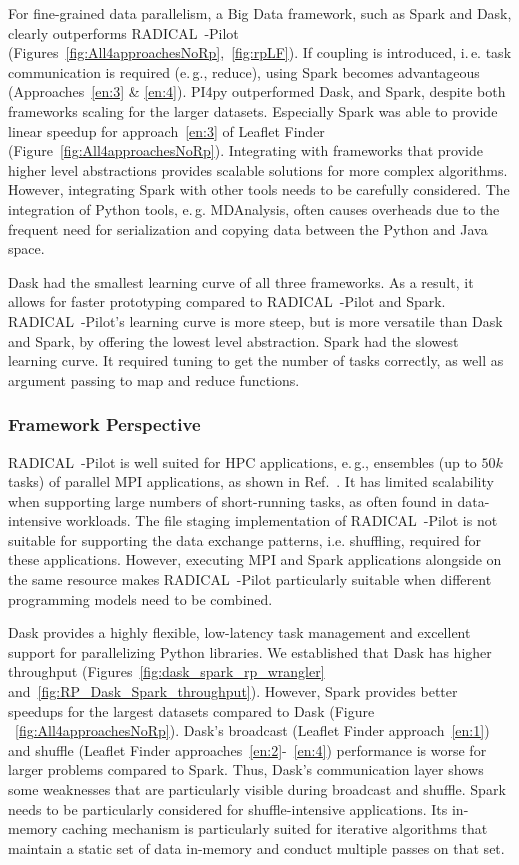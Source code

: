 For fine-grained data parallelism, a Big Data framework, such as Spark and Dask, clearly outperforms RADICAL~-Pilot (Figures~\ref{fig:All4approachesNoRp},~\ref{fig:rpLF}).
If coupling is introduced, i.\,e. task communication is required (e.\,g., reduce), using Spark becomes advantageous (Approaches~\ref{en:3} \& \ref{en:4}). 
PI4py outperformed Dask, and Spark, despite both frameworks scaling for the larger datasets.
Especially Spark was able to provide linear speedup for approach~\ref{en:3} of Leaflet Finder (Figure~\ref{fig:All4approachesNoRp}).
Integrating with frameworks that provide higher level abstractions provides scalable solutions for more complex algorithms.
However, integrating Spark with other tools needs to be carefully considered.
The integration of Python tools, e.\,g. MDAnalysis, often causes overheads due to the frequent need for serialization and copying data between the Python and Java space.

Dask had the smallest learning curve of all three frameworks.
As a result, it allows for faster prototyping compared to RADICAL~-Pilot and Spark.
RADICAL~-Pilot's learning curve is more steep, but is more versatile than Dask and Spark, by offering the lowest level abstraction. 
Spark had the slowest learning curve.
It required tuning to get the number of tasks correctly, as well as argument passing to map and reduce functions.

\subsubsection*{Framework Perspective}
RADICAL~-Pilot is well suited for HPC applications, e.\,g., ensembles (up to $50k$ tasks) of parallel MPI applications, as shown in Ref.~\cite{merzky2018design,merzky2019using}.
It has limited scalability when supporting large numbers of short-running tasks, as often found in data-intensive workloads.
The file staging implementation of RADICAL~-Pilot is not suitable for supporting the data exchange patterns, i.e. shuffling, required for these applications.
However, executing MPI and Spark applications alongside on the same resource makes RADICAL~-Pilot particularly suitable when different programming models need to be combined.

Dask provides a highly flexible, low-latency task management and excellent support for parallelizing Python libraries.
We established that Dask has higher throughput (Figures~\ref{fig:dask_spark_rp_wrangler} and~\ref{fig:RP_Dask_Spark_throughput}).
However, Spark provides better speedups for the largest datasets compared to Dask (Figure ~\ref{fig:All4approachesNoRp}).
Dask's broadcast (Leaflet Finder approach~\ref{en:1}) and shuffle (Leaflet Finder approaches~\ref{en:2}-~\ref{en:4}) performance is worse for larger problems compared to Spark.
Thus, Dask's communication layer shows some weaknesses that are particularly visible during broadcast and shuffle.
Spark needs to be particularly considered for shuffle-intensive applications.
Its in-memory caching mechanism is particularly suited for iterative algorithms that maintain a static set of data in-memory and conduct multiple passes on that set.
